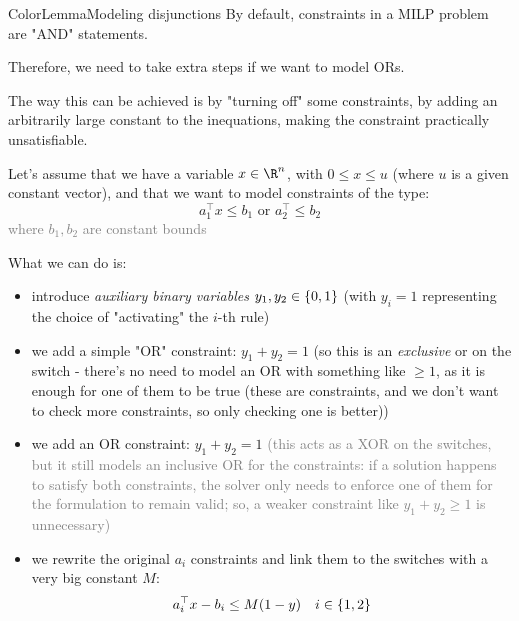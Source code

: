 \documentclass[a4paper, 11pt]{report}
\newcommand{\Rn}{\R^{n}}
\begin{document}
\begin{cframe}{ColorLemma}{Modeling disjunctions}
By default, constraints in a MILP problem are "AND" statements.

Therefore, we need to take extra steps if we want to model ORs.

The way this can be achieved is by "turning off" some constraints, by adding an arbitrarily large constant to the inequations, making the constraint practically unsatisfiable.

Let's assume that we have a variable $x \in \Rn$, with $0 \leq x \leq u$ (where $u$ is a given constant vector), and that we want to model constraints of the type:
$$ a_{1}^{\top}x \leq b_{1} \text{ or } a_{2}^{\top} \leq b_2 $$
\textcolor{gray}{where $b_1, b_2$ are constant bounds}

What we can do is:
\begin{itemize}
    \item introduce \textit{auxiliary binary variables} $y_1, y_2 \in \set{0,1}$ (with $y_{i} = 1$ representing the choice of "activating" the $i$-th rule)
    \item we add a simple "OR" constraint: $y_{1}+y_{2}=1$ (so this is an \textit{exclusive} or on the switch - there's no need to model an OR with something like $\geq 1$, as it is enough for one of them to be true (these are constraints, and we don't want to check more constraints, so only checking one is better))
    \item we add an OR constraint: $y_{1} + y_{2} = 1$ 
        \subitem \textcolor{gray}{\small (this acts as a XOR on the switches, but it still models an inclusive OR for the constraints: if a solution happens to satisfy both constraints, the solver only needs to enforce one of them for the formulation to remain valid; so, a weaker constraint like $y_{1} + y_{2} \geq 1$ is unnecessary)}
    \item we rewrite the original $a_{i}$ constraints and link them to the switches with a very big constant $M$:
        $$ a_{i}^{\top}x - b_{i} \leq M(1-y) \quad i \in \set{1,2} $$

\end{itemize}

\end{cframe}
\end{document}
